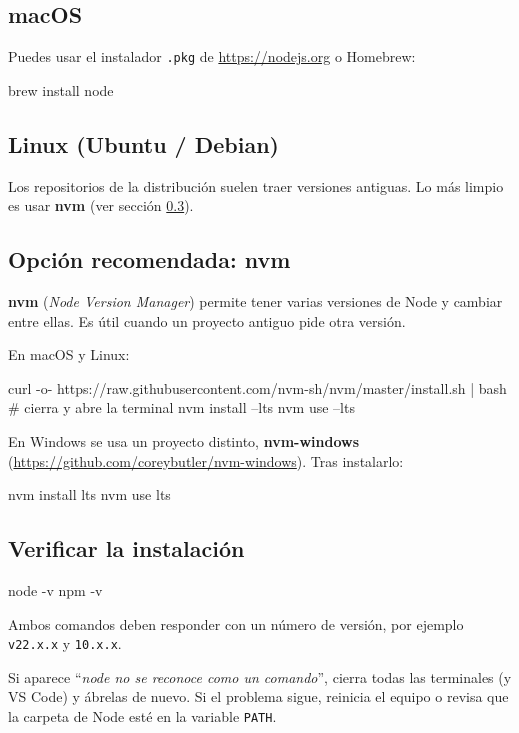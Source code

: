 \documentclass[11pt,a4paper]{article}
\newcommand{\cmd}[1]{\texttt{\color{reactdark}#1}}
\begin{document}
\subsection{macOS}

Puedes usar el instalador \cmd{.pkg} de \url{https://nodejs.org} o Homebrew:
\begin{terminal}
brew install node
\end{terminal}

\subsection{Linux (Ubuntu / Debian)}

Los repositorios de la distribución suelen traer versiones antiguas. Lo más limpio es usar \textbf{nvm} (ver sección \ref{sec:nvm}).

\subsection{Opción recomendada: nvm}\label{sec:nvm}

\textbf{nvm} (\emph{Node Version Manager}) permite tener varias versiones de Node y cambiar entre ellas. Es útil cuando un proyecto antiguo pide otra versión.

En macOS y Linux:
\begin{terminal}
curl -o- https://raw.githubusercontent.com/nvm-sh/nvm/master/install.sh | bash
# cierra y abre la terminal
nvm install --lts
nvm use --lts
\end{terminal}

En Windows se usa un proyecto distinto, \textbf{nvm-windows} (\url{https://github.com/coreybutler/nvm-windows}). Tras instalarlo:
\begin{terminal}
nvm install lts
nvm use lts
\end{terminal}

\subsection{Verificar la instalación}

\begin{terminal}
node -v
npm -v
\end{terminal}

Ambos comandos deben responder con un número de versión, por ejemplo \cmd{v22.x.x} y \cmd{10.x.x}.

\begin{atencion}
Si aparece ``\emph{node no se reconoce como un comando}'', cierra todas las terminales (y VS Code) y ábrelas de nuevo. Si el problema sigue, reinicia el equipo o revisa que la carpeta de Node esté en la variable \cmd{PATH}.
\end{atencion}
\end{document}
